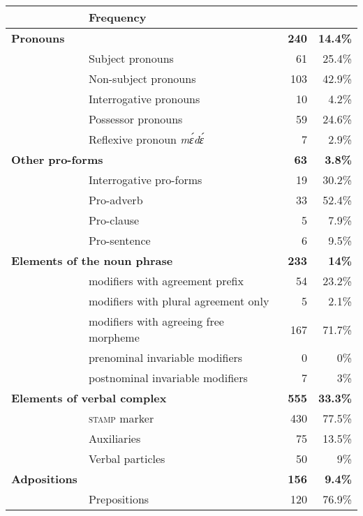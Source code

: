 \begin{table}
\small
{%
\begin{tabular}{ll rr}
 \lsptoprule
  \multicolumn{2}{l}{Word class} &  \multicolumn{2}{l}{Frequency}  \\ %
 \midrule
 {\bfseries Pronouns}  &  & {\bfseries 240} & {\bfseries 14.4\%} \\
 \midrule
  & Subject pronouns  &   61 & 25.4\% \\ %
  & Non-subject pronouns  &   103 & 42.9\% \\ %
  & Interrogative pronouns  &    10 & 4.2\% \\
  & Possessor pronouns  &   59 & 24.6\% \\
  & Reflexive pronoun {\itshape mɛ́dɛ́}  &   7 & 2.9\% \\
 \midrule
  \multicolumn{2}{l}{\bfseries Other pro-forms}   & {\bfseries 63} &  {\bfseries 3.8\%} \\
 \midrule
  & Interrogative pro-forms  &   19  & 30.2\% \\ %
  & Pro-adverb &   33 & 52.4\% \\
  & Pro-clause &    5 & 7.9\% \\
  & Pro-sentence &   6 & 9.5\% \\
 \midrule
 \multicolumn{2}{l}{\bfseries Elements of the noun phrase} & {\bfseries 233} & {\bfseries 14\%} \\
 \midrule
 & modifiers with agreement prefix  &    54 & 23.2\% \\
 & modifiers with plural agreement only  &   5  & 2.1\% \\
 & modifiers with agreeing free morpheme  &   167 & 71.7\% \\
 & prenominal invariable modifiers  &   0 &  0\%  \\
 & postnominal invariable modifiers   &   7 & 3\% \\
 \midrule
 \multicolumn{2}{l}{\bfseries Elements of verbal complex}  & {\bfseries 555} &  {\bfseries 33.3\%} \\
 \midrule
  & \textsc{stamp} marker  &   430 & 77.5\% \\
 & Auxiliaries   &   75  & 13.5\% \\ %
 & Verbal particles   &   50 & 9\% \\
 \midrule
 {\bfseries Adpositions} &  & {\bfseries 156} &  {\bfseries 9.4\%} \\
 \midrule
 & Prepositions  &   120  & 76.9\% \\

\end{tabular}}
\end{table}
